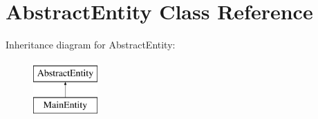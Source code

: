 \hypertarget{classAbstractEntity}{\section{Abstract\-Entity Class Reference}
\label{classAbstractEntity}
}
Inheritance diagram for Abstract\-Entity\-:\begin{figure}[H]
\begin{center}
\leavevmode
\includegraphics[height=2.000000cm]{classAbstractEntity}
\end{center}
\end{figure}

